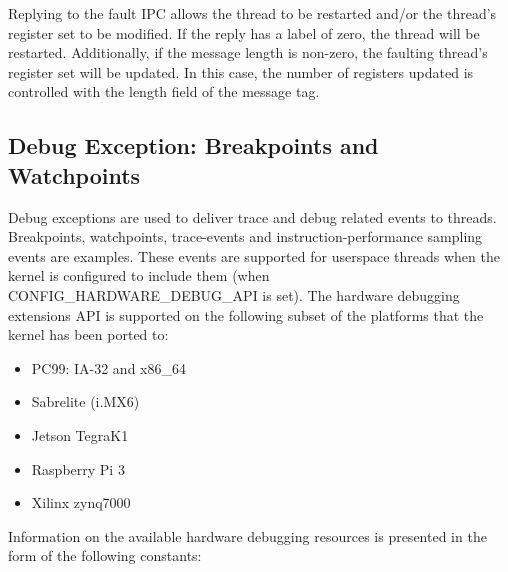 Replying to the fault IPC allows the thread to be restarted
and/or the thread's register set to be modified. If the reply has
a label of zero, the thread will be restarted. Additionally, if the
message length is non-zero, the faulting thread's register set will be
updated. In this case, the number of
registers updated is controlled with the length field of the message
tag.

\subsection{Debug Exception: Breakpoints and Watchpoints}
\label{sec:debug_exceptions}

Debug exceptions are used to deliver trace and debug related events to threads.
Breakpoints, watchpoints, trace-events and instruction-performance sampling
events are examples. These events are supported for userspace threads when the kernel
is configured to include them (when CONFIG\_HARDWARE\_DEBUG\_API is set). The hardware
debugging extensions API is supported on the following subset of the platforms that the
kernel has been ported to:

\begin{itemize}
\item PC99: IA-32 and x86\_64
\item Sabrelite (i.MX6)
\item Jetson TegraK1
\item Raspberry Pi 3
\item Xilinx zynq7000
\end{itemize}

Information on the available hardware debugging resources is presented in the form of the following constants:

